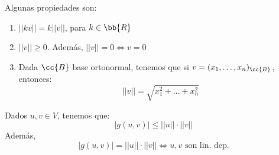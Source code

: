 Algunas propiedades son:
\begin{enumerate}
    \item $||kv|| = k||v||$, para $k\in \bb{R}$

    \item $||v||\geq 0$. Además, $||v||=0\Longleftrightarrow v=0$
    
    \item Dada $\cc{B}$ base ortonormal, tenemos que si $v=(x_1,\dots, x_n)_\cc{B}$, entonces:
    \begin{equation*}
        ||v||=\sqrt{x_1^2 + \dots + x_n^2}
    \end{equation*}
\end{enumerate}
\begin{prop} 
Dados $u,v\in V$, tenemos que:
\begin{equation*}
    |g(u,v)|\leq ||u||\cdot ||v||
\end{equation*}
Además, 
    \begin{equation*}
        |g(u,v)| =  ||u||\cdot ||v|| \Longleftrightarrow u,v\text{ son lin. dep.}
    \end{equation*}
\end{prop}
